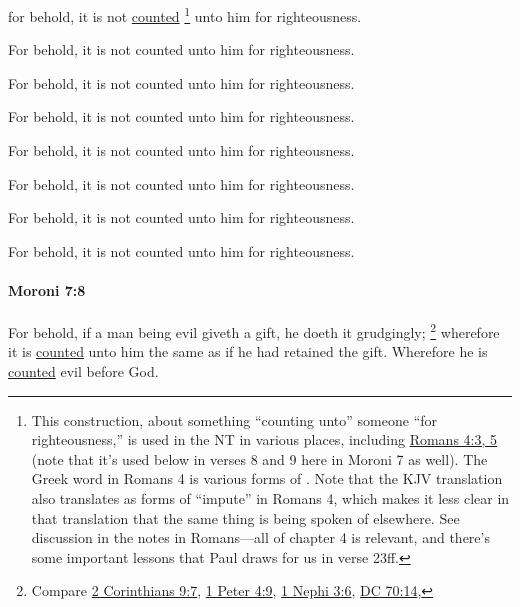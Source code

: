 			for behold, it is not \hyperref[COUNT]{counted}%
				\footnote{%
					\label{MORONI-7-7-counted}%
					This construction, about something ``counting unto'' someone ``for righteousness,'' is used in the NT in various places, including \hyperref[ROMANS-4-3]{Romans 4:3, 5} (note that it's used below in verses 8 and 9 here in Moroni 7 as well). The Greek word in Romans 4 is various forms of \hyperref[LOGIZOMAI]{}. Note that the KJV translation also translates  as forms of ``impute'' in Romans 4, which makes it less clear in that translation that the same thing is being spoken of elsewhere. See discussion in the notes in Romans---all of chapter 4 is relevant, and there's some important lessons that Paul draws for us in verse 23ff.
					}
			unto him for righteousness.
			
			\begin{framed}
				\scriptsize
				\begin{compactdesc}
					\item[OM] [\textit{missing}]
					\item[PM] 
					\item[1830] For behold, it is not counted unto him for righteousness.
					\item[1837] For behold, it is not counted unto him for righteousness.
					\item[1840] For behold, it is not counted unto him for righteousness.
					\item[1879] For behold, it is not counted unto him for righteousness.
					\item[1920] For behold, it is not counted unto him for righteousness.
					\item[1981] For behold, it is not counted unto him for righteousness.
					\item[ABM] For behold, it is not counted unto him for righteousness.
				\end{compactdesc}
			\end{framed}
			
		\paragraph{Moroni 7:8}
			\label{MORONI-7-8}
			
			For behold, if a man being evil giveth a gift,
			he doeth it grudgingly;%
				\footnote{%
					Compare \hyperref[2CORINTHIANS-9-7]{2 Corinthians 9:7}, \hyperref[1PETER-4-9]{1 Peter 4:9}, \hyperref[1NEPHI-3-6]{1 Nephi 3:6}, \hyperref[DC70-14]{DC 70:14}, 
					} 
			wherefore it is \hyperref[COUNT]{counted} unto him the same
			as if he had retained the gift.
			Wherefore he is \hyperref[COUNT]{counted} evil before God.
			
